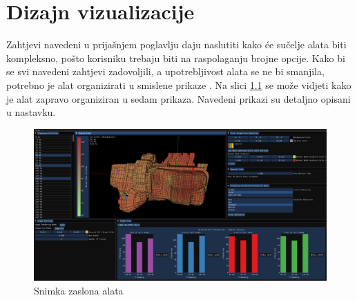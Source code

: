 \documentclass[times, utf8, diplomski]{fer}
\begin{document}
\chapter{Dizajn vizualizacije}

Zahtjevi navedeni u prijašnjem poglavlju daju naslutiti kako će sučelje alata biti kompleksno, pošto korisniku trebaju biti na raspolaganju brojne opcije. Kako bi se svi navedeni zahtjevi zadovoljili, a upotrebljivost alata se ne bi smanjila, potrebno je alat organizirati u smislene prikaze . Na slici \ref{fig:gen-screen} se može vidjeti kako je alat zapravo organiziran u sedam prikaza. Navedeni prikazi su detaljno opisani u nastavku.\\

\begin{figure}[h]
\centering
\includegraphics[width=0.9\linewidth]{general_screenshot.png}
\caption{Snimka zaslona alata}
\label{fig:gen-screen}
\end{figure}
\end{document}
